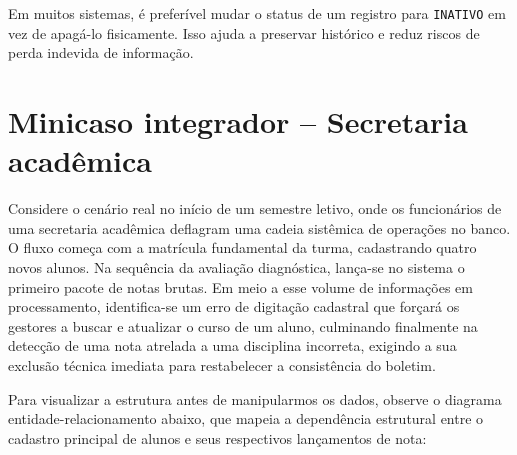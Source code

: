 \begin{quadro_dica}
Em muitos sistemas, é preferível mudar o status de um registro para \texttt{INATIVO} em vez de apagá-lo fisicamente. Isso ajuda a preservar histórico e reduz riscos de perda indevida de informação.
\end{quadro_dica}

\section{Minicaso integrador -- Secretaria acadêmica}

Considere o cenário real no início de um semestre letivo, onde os funcionários de uma secretaria acadêmica deflagram uma cadeia sistêmica de operações no banco. O fluxo começa com a matrícula fundamental da turma, cadastrando quatro novos alunos. Na sequência da avaliação diagnóstica, lança-se no sistema o primeiro pacote de notas brutas. Em meio a esse volume de informações em processamento, identifica-se um erro de digitação cadastral que forçará os gestores a buscar e atualizar o curso de um aluno, culminando finalmente na detecção de uma nota atrelada a uma disciplina incorreta, exigindo a sua exclusão técnica imediata para restabelecer a consistência do boletim.

Para visualizar a estrutura antes de manipularmos os dados, observe o diagrama entidade-relacionamento abaixo, que mapeia a dependência estrutural entre o cadastro principal de alunos e seus respectivos lançamentos de nota:

